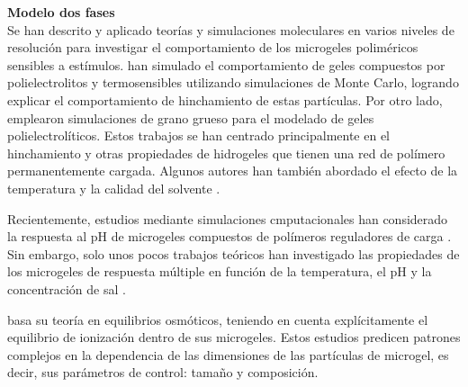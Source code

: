 
\textbf{Modelo dos fases} \\

Se han descrito y aplicado teor\'ias y simulaciones moleculares en varios niveles de resoluci\'on para investigar el comportamiento de los microgeles polim\'ericos sensibles a est\'imulos.
\citet{quesada2011gel} han simulado el comportamiento de geles compuestos por polielectrolitos y termosensibles utilizando simulaciones de Monte Carlo, logrando explicar el comportamiento de hinchamiento de estas part\'iculas. Por otro lado, \citet{ahualli2016coarse} emplearon simulaciones de grano grueso para el modelado de geles polielectrol\'iticos. Estos trabajos se han centrado principalmente en el hinchamiento y otras propiedades de hidrogeles que tienen una red de pol\'imero permanentemente cargada. Algunos autores han tambi\'en abordado el efecto de la temperatura y la calidad del solvente \cite{Jha2011, QuesadaPerez2013, moncho-jorda2016a, ahualli2016coarse, AdroherBenitez2017PCCP}.

Recientemente, estudios mediante simulaciones cmputacionales han considerado la respuesta al pH de microgeles compuestos de pol\'imeros reguladores de carga \cite{Schroeder2015,Rud2017,Sean2018, Hofzumahaus2018,Lu2019}.
Sin embargo, solo unos pocos trabajos te\'oricos han investigado las propiedades de los microgeles de respuesta m\'ultiple en funci\'on de la temperatura, el pH y la concentraci\'on de sal \cite{CaprilesGonzalez2008,polotsky2013collapse}.

\citet{polotsky2013collapse} basa su teor\'ia en equilibrios osm\'oticos, teniendo en cuenta expl\'icitamente el equilibrio de ionizaci\'on dentro de sus microgeles. Estos estudios predicen patrones complejos en la dependencia de las dimensiones de las part\'iculas de microgel, es decir, sus par\'ametros de control: tama\~no y composici\'on.

